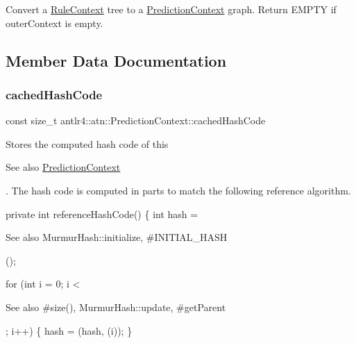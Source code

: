 Convert a \hyperlink{classantlr4_1_1RuleContext}{Rule\+Context} tree to a \hyperlink{classantlr4_1_1atn_1_1PredictionContext}{Prediction\+Context} graph. Return E\+M\+P\+TY if outer\+Context is empty. 

\subsection{Member Data Documentation}
\mbox{\label{classantlr4_1_1atn_1_1PredictionContext_a2eb2612faaa082712dd779c13f588633}} 
\subsubsection{\texorpdfstring{cached\+Hash\+Code}{cachedHashCode}}
{\footnotesize\ttfamily const size\+\_\+t antlr4\+::atn\+::\+Prediction\+Context\+::cached\+Hash\+Code}



Stores the computed hash code of this \begin{DoxySeeAlso}{See also}
\hyperlink{classantlr4_1_1atn_1_1PredictionContext}{Prediction\+Context}


\end{DoxySeeAlso}
. The hash code is computed in parts to match the following reference algorithm. 


\begin{DoxyPre}
 private int referenceHashCode() \{
     int hash = \begin{DoxySeeAlso}{See also}
MurmurHash::initialize, #INITIAL\_HASH


\end{DoxySeeAlso}
();\end{DoxyPre}



\begin{DoxyPre}     for (int i = 0; i < \begin{DoxySeeAlso}{See also}
#size(), MurmurHash::update, #getParent


\end{DoxySeeAlso}
; i++) \{
         hash = (hash, (i));
     \}\end{DoxyPre}



